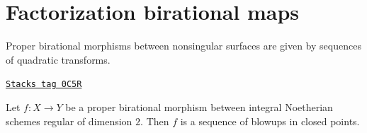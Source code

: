 \section{Factorization birational maps}
\label{resolve-section-factorizing}
Proper birational morphisms between nonsingular surfaces are given by
sequences of quadratic transforms.

\begin{lemma}
\label{resolve-lemma-proper-birational-regular-surfaces}
\href{https://stacks.math.columbia.edu/tag/0C5R}{\texttt{Stacks tag 0C5R}}

Let $f : X \to Y$ be a proper birational morphism between
integral Noetherian schemes regular of dimension $2$.
Then $f$ is a sequence of blowups in closed points.
\end{lemma}

